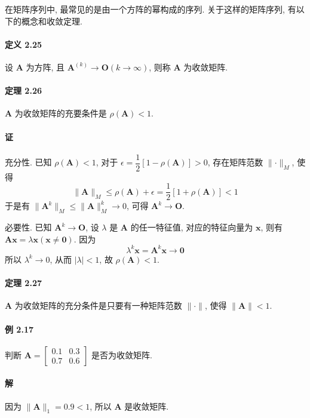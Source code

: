 \par 在矩阵序列中, 最常见的是由一个方阵的幂构成的序列. 关于这样的矩阵序列, 有以下的概念和收敛定理.

\paragraph*{定义 2.25} 设 $\bm{A}$ 为方阵, 且 $\bm{A}^{(k)} \to \bm{O}(k \to \infty)$, 则称 $\bm{A}$ 为收敛矩阵.

\paragraph*{定理 2.26} $\bm{A}$ 为收敛矩阵的充要条件是 $\rho(\bm{A}) < 1$.

\paragraph*{证} 充分性. 已知 $\rho(\bm{A}) < 1$, 对于 $\epsilon = \dfrac{1}{2}[1 - \rho(\bm{A})] > 0$, 存在矩阵范数 $\lVert \bm{\cdot} \rVert _M$, 使得
$$
    \lVert \bm{A} \rVert _M \leqslant \rho(\bm{A}) + \epsilon = \dfrac{1}{2}[1 + \rho(\bm{A})] < 1
$$
于是有 $\lVert \bm{A}^k \rVert _M \leqslant \lVert \bm{A} \rVert ^k_M \to 0$, 可得 $\bm{A}^k \to \bm{O}$.

\par 必要性. 已知 $\bm{A}^k \to \bm{O}$, 设 $\lambda$ 是 $\bm{A}$ 的任一特征值, 对应的特征向量为 $\bm{x}$, 则有
$\bm{Ax} = \lambda\bm{x}(\bm{x} \neq \bm{0})$. 因为
$$
    \lambda^k\bm{x} = \bm{A}^k\bm{x} \to \bm{0}
$$
所以 $\lambda^k \to 0$, 从而 $\lvert \lambda \rvert < 1$, 故 $\rho(\bm{A}) < 1$.

\paragraph*{定理 2.27} $\bm{A}$ 为收敛矩阵的充分条件是只要有一种矩阵范数 $\lVert \bm{\cdot} \rVert$, 使得 $\lVert \bm{A} \rVert < 1$.

\paragraph*{例 2.17} 判断 $\bm{A} = \begin{bmatrix}
    0.1 & 0.3 \\
    0.7 & 0.6
\end{bmatrix}$ 是否为收敛矩阵.

\paragraph*{解} 因为 $\lVert \bm{A} \rVert _1 = 0.9 < 1$, 所以 $\bm{A}$ 是收敛矩阵.

